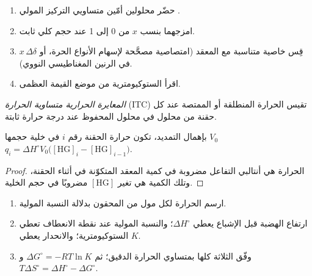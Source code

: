 \begin{method}\label{met:b3:supramolecular:job}
\begin{enumerate}
  \item حضّر محلولين أمّين متساويي التركيز المولي  .
  \item امزجهما بنسب $x$ من 0 إلى 1 عند حجم كلي ثابت.
  \item قِس خاصية متناسبة مع المعقد (امتصاصية مصحَّحة
        لإسهام الأنواع الحرة، أو $x\,\Delta\delta$ في الرنين المغناطيسي النووي).
  \item اقرأ الستوكيومترية من موضع القيمة العظمى.
\end{enumerate}
\end{method}

\begin{definition}\label{def:b3:supramolecular:itc}
\emph{المعايرة الحرارية متساوية الحرارة}
(ITC) تقيس الحرارة المنطلقة أو الممتصة عند كل حقنة من محلول
 في محلول  المحفوظ عند درجة حرارة ثابتة.
\end{definition}

\begin{proposition}\label{prop:b3:supramolecular:itc}
بإهمال التمديد، تكون حرارة الحقنة رقم $i$ في خلية حجمها $V_0$
$q_i = \Delta H^\circ V_0\bigl([\mathrm{HG}]_i - [\mathrm{HG}]_{i-1}\bigr)$.
\end{proposition}

\begin{proof}
الحرارة هي أنتالبي التفاعل مضروبة في كمية المعقد المتكوّنة في أثناء
الحقنة، وتلك الكمية هي تغير $[\mathrm{HG}]$ مضروبًا في حجم الخلية.
\end{proof}

\begin{method}\label{met:b3:supramolecular:itc}
\begin{enumerate}
  \item ارسم الحرارة لكل مول من  المحقون بدلالة النسبة المولية.
  \item ارتفاع الهضبة قبل الإشباع يعطي $\Delta H^\circ$؛ والنسبة المولية عند
        نقطة الانعطاف تعطي الستوكيومترية؛ والانحدار يعطي $K$.
  \item وفّق الثلاثة كلها بمتساوي الحرارة الدقيق؛ ثم $\Delta G^\circ = -RT\ln K$ 
        و$T\Delta S^\circ = \Delta H^\circ - \Delta G^\circ$.
\end{enumerate}
\end{method}

